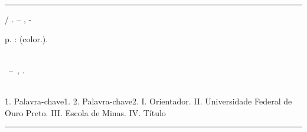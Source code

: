 \documentclass[
	12pt,				%
	oneside, %
	a4paper,			%
	english,			%
	brazil				%
	]{abntex2}
\begin{document}

\imprimirfolhaderosto*



%
%     
%
\begin{fichacatalografica}
	\vspace*{\fill}					%
	\hrule							%
	\begin{center}					%
	\begin{minipage}[c]{12.5cm}		%

	\imprimirautor

	\hspace{0.5cm} \imprimirtitulo  / \imprimirautor. --
	\imprimirlocal, \the\year-

	  \hspace{0.5cm}  p. : (color.).\\
	\hspace{0.5cm} \imprimirorientadorRotulo~\imprimirorientador\\

	\hspace{0.5cm}
	\parbox[t]{\textwidth}{\imprimirtipotrabalho~--~\imprimirinstituicao,
	\imprimirdata.}\\

	\hspace{0.5cm}
		1. Palavra-chave1.
		2. Palavra-chave2.
		I. Orientador.
		II. Universidade Federal de Ouro Preto.
		III. Escola de Minas.
		IV. Título\\


	\end{minipage}
	\end{center}
	\hrule
\end{fichacatalografica}
\end{document}
